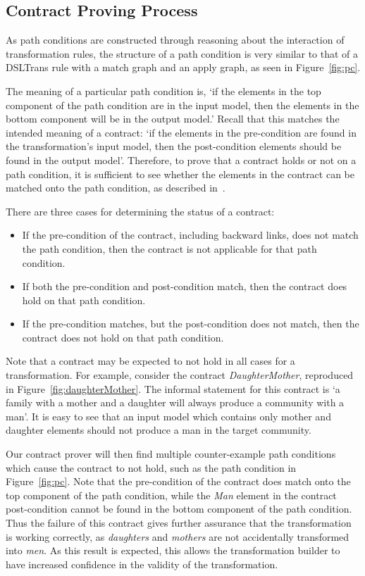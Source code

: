 \subsection{Contract Proving Process}
\label{subsub:contract_proving}

As path conditions are constructed through reasoning about the interaction of
transformation rules, the structure of a path condition is very similar to that
of a DSLTrans rule with a match graph and an apply graph, as seen in
Figure~\ref{fig:pc}.

The meaning of a particular path condition is, `if the elements in the top component of the path condition are in the input model, then the elements in the bottom component will be in the output model.' Recall that this matches the intended meaning of a contract: `if the elements in
the pre-condition are found in the transformation's input model, then the
post-condition elements should be found in the output model'. Therefore, to prove that a
contract holds or not on a path condition, it is sufficient to see whether the
elements in the contract can be matched onto the path condition, as described
in~\cite{Lucio2014}.


There are three cases for determining the status of a contract:
\begin{itemize}
\item If the pre-condition of the contract, including backward links, does not match the path condition, then the contract is not applicable for that path condition.
\item If both the pre-condition and post-condition match, then the contract does hold on that path condition.
\item If the pre-condition matches, but the post-condition does not match, then the contract does not hold on that path condition.
\end{itemize}

Note that a contract may be expected to not hold in all cases for a
transformation. For example, consider the contract \textit{Daughter\-Mother},
reproduced in Figure~\ref{fig:daughterMother}. The informal statement for this contract is `a family with a mother and a
daughter will always produce a community with a man'.  It is easy to see that an input model which contains only mother and
 daughter elements should not produce a man in the target community.

Our contract prover will then find multiple
 counter-example path conditions which cause the contract to not hold, such as the path condition in Figure~\ref{fig:pc}. Note that the
pre-condition of the contract does match onto the top component of the path condition, while the
\textit{Man} element in the contract post-condition cannot be found in the bottom component of the path condition. Thus the failure of this contract gives further
assurance that the transformation is working correctly, as \textit{daughters}
and \textit{mothers} are not accidentally transformed into \textit{men}. As this result is expected, this allows the transformation builder to have increased confidence in the validity of the transformation.


